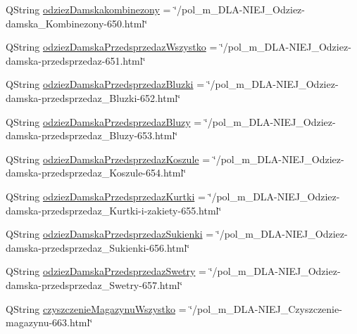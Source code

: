 \begin{DoxyCompactItemize}
\item 
Q\+String \mbox{\hyperlink{classdownload_product_a57ededb3658c455aa6e50744726e945d}{odziez\+Damskakombinezony}} = \char`\"{}/pol\+\_\+m\+\_\+\+D\+LA-\/N\+I\+E\+J\+\_\+\+Odziez-\/damska\+\_\+\+Kombinezony-\/650.html\char`\"{}
\item 
Q\+String \mbox{\hyperlink{classdownload_product_a08c994ee65fd102731cc5bd45f8b2ac7}{odziez\+Damska\+Przedsprzedaz\+Wszystko}} = \char`\"{}/pol\+\_\+m\+\_\+\+D\+LA-\/N\+I\+E\+J\+\_\+\+Odziez-\/damska-\/przedsprzedaz-\/651.html\char`\"{}
\item 
Q\+String \mbox{\hyperlink{classdownload_product_a7b0e9c1a005d409d4450bdd298dd849e}{odziez\+Damska\+Przedsprzedaz\+Bluzki}} = \char`\"{}/pol\+\_\+m\+\_\+\+D\+LA-\/N\+I\+E\+J\+\_\+\+Odziez-\/damska-\/przedsprzedaz\+\_\+\+Bluzki-\/652.html\char`\"{}
\item 
Q\+String \mbox{\hyperlink{classdownload_product_ac131c0b193a5e1cbb6436a0eb91a3e42}{odziez\+Damska\+Przedsprzedaz\+Bluzy}} = \char`\"{}/pol\+\_\+m\+\_\+\+D\+LA-\/N\+I\+E\+J\+\_\+\+Odziez-\/damska-\/przedsprzedaz\+\_\+\+Bluzy-\/653.html\char`\"{}
\item 
Q\+String \mbox{\hyperlink{classdownload_product_a693e94aa3b634a479d43514c7b5ecaf8}{odziez\+Damska\+Przedsprzedaz\+Koszule}} = \char`\"{}/pol\+\_\+m\+\_\+\+D\+LA-\/N\+I\+E\+J\+\_\+\+Odziez-\/damska-\/przedsprzedaz\+\_\+\+Koszule-\/654.html\char`\"{}
\item 
Q\+String \mbox{\hyperlink{classdownload_product_aa3f26af3c250a55be1ee6c3fdbc7638c}{odziez\+Damska\+Przedsprzedaz\+Kurtki}} = \char`\"{}/pol\+\_\+m\+\_\+\+D\+LA-\/N\+I\+E\+J\+\_\+\+Odziez-\/damska-\/przedsprzedaz\+\_\+\+Kurtki-\/i-\/zakiety-\/655.html\char`\"{}
\item 
Q\+String \mbox{\hyperlink{classdownload_product_a14c660d69e3f3f8d070755fc19fd4b37}{odziez\+Damska\+Przedsprzedaz\+Sukienki}} = \char`\"{}/pol\+\_\+m\+\_\+\+D\+LA-\/N\+I\+E\+J\+\_\+\+Odziez-\/damska-\/przedsprzedaz\+\_\+\+Sukienki-\/656.html\char`\"{}
\item 
Q\+String \mbox{\hyperlink{classdownload_product_a29cc8dcdc5bf8482851214fc212def46}{odziez\+Damska\+Przedsprzedaz\+Swetry}} = \char`\"{}/pol\+\_\+m\+\_\+\+D\+LA-\/N\+I\+E\+J\+\_\+\+Odziez-\/damska-\/przedsprzedaz\+\_\+\+Swetry-\/657.html\char`\"{}
\item 
Q\+String \mbox{\hyperlink{classdownload_product_ab3ef911526bdc299a80d18f8fd680d56}{czyszczenie\+Magazynu\+Wszystko}} = \char`\"{}/pol\+\_\+m\+\_\+\+D\+LA-\/N\+I\+E\+J\+\_\+\+Czyszczenie-\/magazynu-\/663.html\char`\"{}

\end{DoxyCompactItemize}
